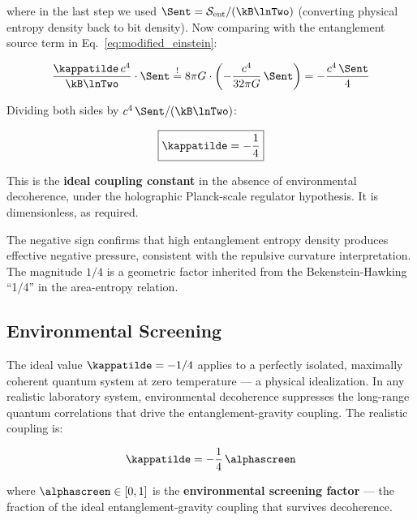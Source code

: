\noindent where in the last step we used $\Sent = \mathcal{S}_{\mathrm{ent}}
/(\kB\lnTwo)$ (converting physical entropy density back to bit density).
Now comparing with the entanglement source term in
Eq.~\eqref{eq:modified_einstein}:

\begin{equation}
    \frac{\kappatilde\,c^4}{\kB\lnTwo}\cdot\Sent
    \stackrel{!}{=} 8\pi G\cdot\left(-\frac{c^4}{32\pi G}\,\Sent\right)
    = -\frac{c^4\,\Sent}{4}
\end{equation}

\noindent Dividing both sides by $c^4\,\Sent/(\kB\lnTwo)$:

\begin{equation}
    \boxed{\kappatilde = -\frac{1}{4}}
    \label{eq:kappa_result}
\end{equation}

\noindent This is the \textbf{ideal coupling constant} in the absence
of environmental decoherence, under the holographic Planck-scale
regulator hypothesis. It is dimensionless, as required.

The negative sign confirms that high entanglement entropy density produces
effective negative pressure, consistent with the repulsive curvature
interpretation. The magnitude $1/4$ is a geometric factor inherited from
the Bekenstein-Hawking ``1/4'' in the area-entropy relation.

\subsection{Environmental Screening}
\label{subsec:screening}

The ideal value $\kappatilde = -1/4$ applies to a perfectly isolated,
maximally coherent quantum system at zero temperature --- a physical
idealization. In any realistic laboratory system, environmental
decoherence suppresses the long-range quantum correlations that drive the
entanglement-gravity coupling. The realistic coupling is:

\begin{equation}
    \kappatilde = -\frac{1}{4}\,\alphascreen
    \label{eq:realistic_kappa}
\end{equation}

\noindent where $\alphascreen \in [0,1]$ is the \textbf{environmental
screening factor} --- the fraction of the ideal entanglement-gravity
coupling that survives decoherence.


